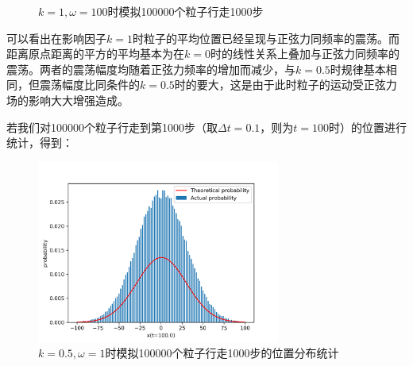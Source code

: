 \documentclass[a4paper,11pt]{article}
\begin{document}
\begin{figure}[!htbp]   
\centering     
{}
\caption{$k=1,\omega=100$时模拟100000个粒子行走1000步}      
\end{figure}






\newpage
 可以看出在影响因子$k=1$时粒子的平均位置已经呈现与正弦力同频率的震荡。而距离原点距离的平方的平均基本为在$k=0$时的线性关系上叠加与正弦力同频率的震荡。两者的震荡幅度均随着正弦力频率的增加而减少，与$k=0.5$时规律基本相同，但震荡幅度比同条件的$k=0.5$时的要大，这是由于此时粒子的运动受正弦力场的影响大大增强造成。
 
 
 若我们对100000个粒子行走到第1000步（取$\Delta t=0.1$，则为$t=100$时）的位置进行统计，得到：
\begin{figure}[!htbp]   
\centering
\includegraphics[bb= 0 0 450 370,width=8cm] {p-1.png}
\caption{$k=0.5,\omega=1$时模拟100000个粒子行走1000步的位置分布统计}      
\end{figure}
\end{document}
